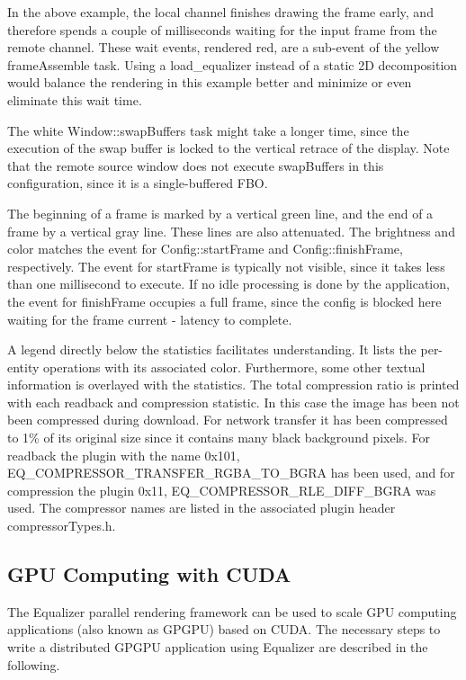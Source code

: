 \documentclass[10pt,a4]{scrartcl}
\begin{document}
In the above example, the local channel finishes drawing the frame early, and
therefore spends a couple of milliseconds waiting for the input frame from the
remote channel. These wait events, rendered red, are a sub-event of the yellow
\textsf{frameAssemble} task. Using a \textsf{load\_equalizer} instead of a
static 2D decomposition would balance the rendering in this example better and
minimize or even eliminate this wait time.

The white \textsf{Window::swapBuffers} task might take a longer time, since the
execution of the swap buffer is locked to the vertical retrace of the
display. Note that the remote source window does not execute swapBuffers in
this configuration, since it is a single-buffered FBO.

The beginning of a frame is marked by a vertical green line, and the end of a
frame by a vertical gray line. These lines are also attenuated. The brightness
and color matches the event for \textsf{Config::startFrame} and
\textsf{Config::finishFrame}, respectively. The event for \textsf{startFrame} is
typically not visible, since it takes less than one millisecond to execute. If
no idle processing is done by the application, the event for
\textsf{finishFrame} occupies a full frame, since the config is blocked here
waiting for the frame \textsf{current - latency} to complete.

A legend directly below the statistics facilitates understanding. It lists the
per-entity operations with its associated color. Furthermore, some other textual
information is overlayed with the statistics. The total compression ratio is
printed with each readback and compression statistic. In this case the image has
been not been compressed during download. For network transfer it has been
compressed to 1\% of its original size since it contains many black background
pixels. For readback the plugin with the name \textsf{0x101,
  EQ\_COMPRESSOR\_TRANS\-FER\_RGBA\_TO\_BGRA} has been used, and for compression
the plugin \textsf{0x11, EQ\_COM\-PRESSOR\_RLE\_DIFF\_BGRA} was used. The
compressor names are listed in the associated plugin header
\textsf{compressorTypes.h}.

\subsection{\label{sCUDA}GPU Computing with CUDA}

The Equalizer parallel rendering framework can be used to scale GPU 
computing applications (also known as GPGPU) based on CUDA. The necessary
steps to write a distributed GPGPU application using Equalizer are described
in the following.
\end{document}
